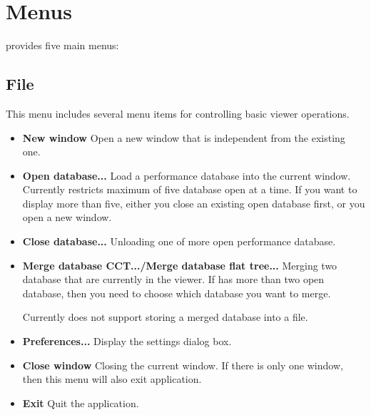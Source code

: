 \documentclass[english]{article}
\begin{document}

\section{Menus}

 provides five main menus:


\subsection{File}
This menu includes several menu items for controlling basic viewer operations.
\begin{itemize}
\item \textbf{New window}
  Open a new  window that is independent from the existing one.

\item \textbf{Open database...}
  Load a performance database into the current  window. 
Currently  restricts maximum of five database open at a time. 
If you want to display more than five, either you close an existing open database first, or you open a new  window.

\item \textbf{Close database...}
  Unloading one of more open performance database.

\item \textbf{Merge database CCT.../Merge database flat tree...}
  Merging two database that are currently in the viewer. If  has more than two
open database, then you need to choose which database you want to merge.

Currently  does not support storing a merged database into a file.

\item \textbf{Preferences...}
  Display the settings dialog box.

\item \textbf{Close window}
  Closing the current window. If there is only one window, then this menu will also exit  application.

\item \textbf{Exit}
  Quit the  application.

\end{itemize}
\end{document}
